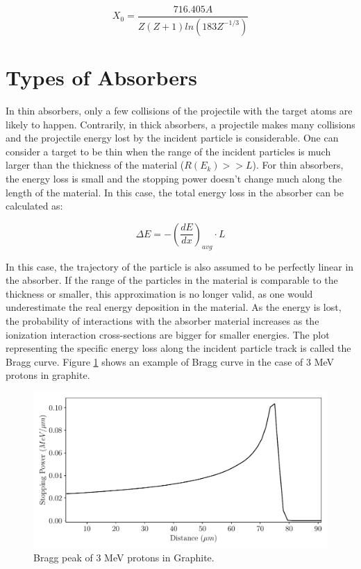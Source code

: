 \begin{equation}
    X_0 = \frac{716.405 A}{Z\left(Z+1\right)ln\left(183 Z^{-1/3}\right)}
    \label{eq:radiationlength.}
\end{equation}

\section{Types of Absorbers}

In thin absorbers, only a few collisions of the projectile with the target atoms are likely to happen. Contrarily, in thick absorbers, a projectile makes many collisions and the projectile energy lost by the incident particle is considerable. One can consider a target to be thin when the range of the incident particles is much larger than the thickness of the material ($R(E_k) >> L$). For thin absorbers, the energy loss is small and the stopping power doesn't change much along the length of the material. In this case, the total energy loss in the absorber can be calculated as: 

\begin{equation}
    \Delta E = - \left(\frac{dE}{dx}\right)_{avg} \cdot L
    \label{eq:thinabs}
\end{equation}

In this case, the trajectory of the particle is also assumed to be perfectly linear in the absorber. If the range of the particles in the material is comparable to the thickness or smaller, this approximation is no longer valid, as one would underestimate the real energy deposition in the material. As the energy is lost, the probability of interactions with the absorber material increases as the ionization interaction cross-sections are bigger for smaller energies. The plot representing the specific energy loss along the incident particle track is called the Bragg curve. Figure \ref{fig:Bragg} shows an example of Bragg curve in the case of 3 \si[]{\mega\electronvolt} protons in graphite. 

\begin{figure}[h]
    \centering
    \includegraphics[width=0.7\columnwidth]{Bragg_Graphite/Bragg.pdf}
    \caption{Bragg peak of 3 \si[]{\mega \electronvolt} protons in Graphite. }
    \label{fig:Bragg}
\end{figure}

